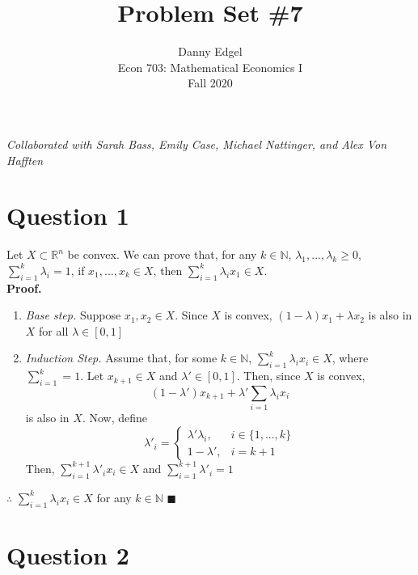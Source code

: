 \documentclass{article}
\newcommand{\N}{\mathbb{N}}
\newcommand{\R}{\mathbb{R}}
\begin{document}
\title{	Problem Set \#7 }
\author{ 	Danny Edgel 							\\ 
			Econ 703: Mathematical Economics I		\\
			Fall 2020								\\
		}
\maketitle\thispagestyle{empty}


\noindent\textit{Collaborated with Sarah Bass, Emily Case, Michael Nattinger, and Alex Von Hafften}


\section*{Question 1}
Let $X\subset\R^n$ be convex. We can prove that, for any $k\in\N$, $\lambda_1,...,\lambda_k\geq 0$, $\sum_{i=1}^k\lambda_i=1$, if ${x_1,...,x_k\in X}$, then ${\sum_{i=1}^k\lambda_ix_1\in X}$.
\medskip \\
\textbf{Proof.}
\begin{enumerate}
	\item \textit{Base step.} Suppose $x_1,x_2\in X$. Since $X$ is convex, $(1-\lambda)x_1 + \lambda x_2$ is also in $X$ for all $\lambda\in[0,1]$
	\item \textit{Induction Step.} Assume that, for some $k\in\N$, $\sum_{i=1}^k\lambda_ix_i\in X$, where $\sum_{i=1}^k=1$. Let $x_{k+1}\in X$ and $\lambda'\in[0,1]$. Then, since $X$ is convex, 
		\[
			(1-\lambda')x_{k+1} + \lambda'\sum_{i=1}\lambda_ix_i
		\]
		is also in $X$. Now, define
		\[
			{\lambda'}_i = \begin{cases} \lambda'\lambda_i, &i\in\{1,...,k\} \\ 1 - \lambda', &i=k+1 \end{cases}
		\]
		Then, $\sum_{i=1}^{k+1}{\lambda'}_ix_i\in X$ and $\sum_{i=1}^{k+1}{\lambda'}_i=1$
\end{enumerate}
$\therefore$ $\sum_{i=1}^k\lambda_ix_i\in X$ for any $k\in\N$ $\blacksquare$

	

\section*{Question 2}


\end{document}
